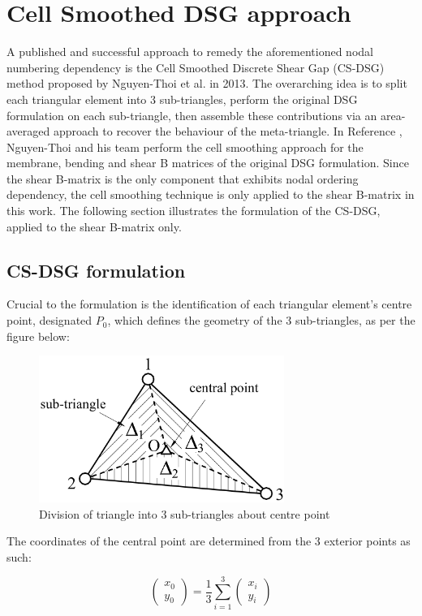 \section{Cell Smoothed DSG approach}
A published and successful approach to remedy the aforementioned nodal numbering dependency is the Cell Smoothed Discrete Shear Gap (CS-DSG) method proposed by Nguyen-Thoi et al. \cite{Ngu13} in 2013. The overarching idea is to split each triangular element into 3 sub-triangles, perform the original DSG formulation on each sub-triangle, then assemble these contributions via an area-averaged approach to recover the behaviour of the meta-triangle. In Reference \cite{Ngu13}, Nguyen-Thoi and his team perform the cell smoothing approach for the membrane, bending and shear B matrices of the original DSG formulation. Since the shear B-matrix is the only component that exhibits nodal ordering dependency, the cell smoothing technique is only applied to the shear B-matrix in this work. The following section illustrates the formulation of the CS-DSG, applied to the shear B-matrix only.

\subsection{CS-DSG formulation}
Crucial to the formulation is the identification of each triangular element's centre point, designated $P_0$, which defines the geometry of the 3 sub-triangles, as per the figure below:

\begin{figure}[H]
	\centering
	\includegraphics[width=8cm]{images/CSDSG3_subtriangles.png}
	\caption{Division of triangle into 3 sub-triangles about centre point \cite{phung2013static}}
	\label{fig:triangle division}
\end{figure}

The coordinates of the central point are determined from the 3 exterior points as such:

\begin{equation} 
\begin{pmatrix}
x_0 \\
y_0
\end{pmatrix}
=
\frac{1}{3}
\sum_{i=1}^3
\begin{pmatrix}
x_i \\
y_i
\end{pmatrix}
\label{eqCSDSG0}
\end{equation}

